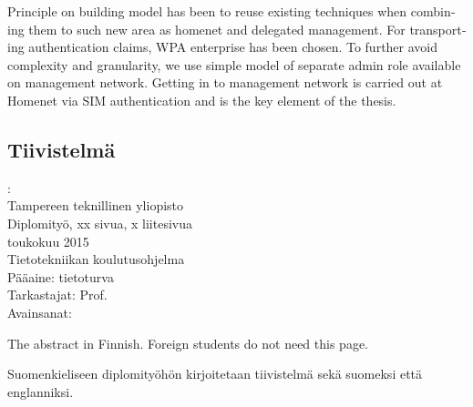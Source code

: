 \documentclass[12pt,a4paper,english]{tutthesis}
\begin{document}
\begin{otherlanguage}{english}
Principle on building model has been to reuse existing techniques when
combining them to such new area as 
homenet and delegated management.
 For transporting authentication claims, WPA enterprise has been chosen. To further avoid complexity and granularity, we
use simple model of separate admin role available on
management network. Getting in to management network is carried out at
Homenet via SIM authentication and is the key element of the thesis.



\end{otherlanguage} %

\begin{otherlanguage}{finnish} %
\chapter*{Tiivistelmä}         %

\begin{spacing}{1.0}
         {\bf \textsf{\MakeUppercase{\@author}}}: \@titleB\\  %
         \textsf{Tampereen teknillinen yliopisto}\\
         \textsf{Diplomityö, xx sivua, x liitesivua}\\ %
         \textsf{toukokuu 2015}\\
         \textsf{Tietotekniikan koulutusohjelma}\\
         \textsf{Pääaine: tietoturva}\\
         \textsf{Tarkastajat:  Prof. \@examiner}\\ %
         \textsf{Avainsanat: }\\
\end{spacing}
The abstract in Finnish. Foreign students do not need this page.

Suomenkieliseen diplomityöhön kirjoitetaan tiivistelmä sekä suomeksi
että englanniksi.

\end{otherlanguage} %
\end{document}
